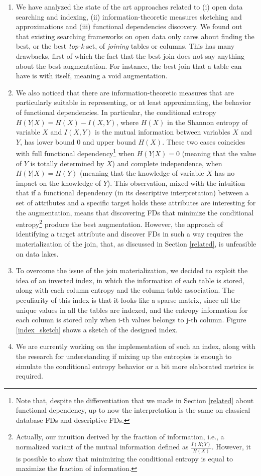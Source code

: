 \begin{enumerate}
    \item We have analyzed the state of the art approaches related to (i) open data searching and indexing, (ii) information-theoretic measures sketching and approximations and (iii) functional dependencies discovery. We found out that existing searching frameworks on open data only cares about finding the best, or the best \textit{top-k} set, of \textit{joining} tables or columns. This has many drawbacks, first of which the fact that the best join does not say anything about the best augmentation. For instance, the best join that a table can have is with itself, meaning a void augmentation. 
    \item We also noticed that there are information-theoretic measures that are particularly suitable in representing, or at least approximating, the behavior of functional dependencies. In particular, the conditional entropy $H(Y|X) = H(X)-I(X,Y)$, where $H(X)$ in the Shannon entropy of variable $X$ and $I(X,Y)$ is the mutual information between variables $X$ and $Y$, has lower bound 0 and upper bound $H(X)$. These two cases coincides with full functional dependency\footnote{Note that, despite the differentiation that we made in Section \ref{related} about functional dependency, up to now the interpretation is the same on classical database FDs and descriptive FDs.} when $H(Y|X) = 0$ (meaning that the value of $Y$ is totally determined by $X$) and complete independence, when $H(Y|X) = H(Y)$ (meaning that the knowledge of variable $X$ has no impact on the knowledge of $Y$). This observation, mixed with the intuition that if a functional dependency (in its descriptive interpretation) between a set of attributes and a specific target holds these attributes are interesting for the augmentation, means that discovering FDs that minimize the conditional entropy\footnote{Actually, our intuition derived by the fraction of information, i.e., a normalized variant of the mutual information defined as $\frac{I(X;Y)}{H(X)}$. However, it is possible to show that minimizing the conditional entropy is equal to maximize the fraction of information.} produce the best augmentation. However, the approach of identifying a target attribute and discover FDs in such a way requires the materialization of the join, that, as discussed in Section \ref{related}, is unfeasible on data lakes.
    \item To overcome the issue of the join materialization, we decided to exploit the idea of an inverted index, in which the information of each table is stored, along with each column entropy and the column-table association. The peculiarity of this index is that it looks like a sparse matrix, since all the unique values in all the tables are indexed, and the entropy information for each column is stored only when i-th values belongs to j-th column. Figure \ref{index_sketch} shows a sketch of the designed index.
    \item We are currently working on the implementation of such an index, along with the research for understanding if mixing up the entropies is enough to simulate the conditional entropy behavior or a bit more elaborated metrics is required.
\end{enumerate}


